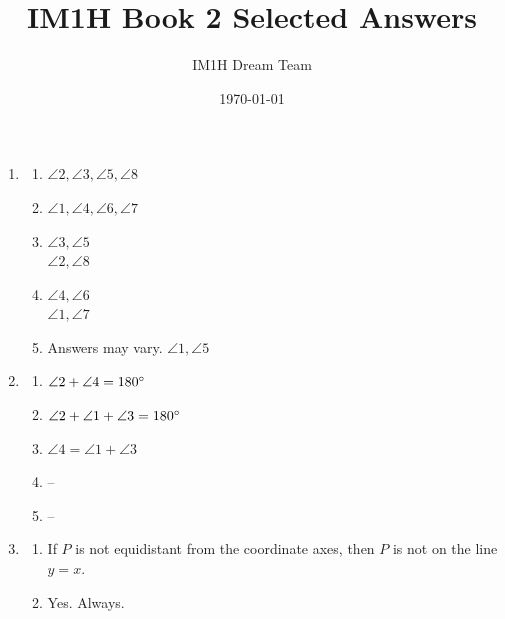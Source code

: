 \documentclass{article}
\title{IM1H Book 2 Selected Answers}
\author{IM1H Dream Team}
\date{\today}
\begin{document}
\maketitle

\begin{enumerate}

\item

	\begin{enumerate}
	
	\item $\angle 2, \angle3, \angle 5, \angle 8$
	
	\item $\angle 1, \angle 4, \angle 6, \angle 7$
	
	\item $\angle 3, \angle 5$ \\
		$\angle 2, \angle 8$
	
	\item $\angle 4, \angle 6$ \\
		$\angle 1, \angle 7$
	
	\item Answers may vary. $\angle 1, \angle 5$
	
	\end{enumerate}
	
\item

	\begin{enumerate}
	
	\item $\angle 2 + \angle 4 = 180 \degree$
	
	\item $\angle 2 + \angle 1 + \angle 3 = 180 \degree$
	
	\item $\angle 4 = \angle 1 + \angle 3$
	
	\item -- 
	
	\item --
	
	\end{enumerate}
	
\item

	\begin{enumerate}
	
	\item If $P$ is not equidistant from the coordinate axes, then $P$ is not on the line $y = x$.
	
	\item Yes. Always.
	

\end{enumerate}
\end{enumerate}
\end{document}
